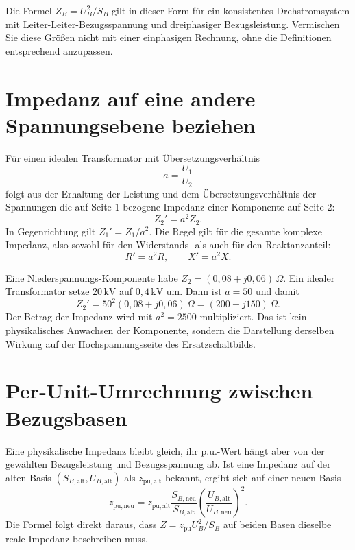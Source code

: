 \begin{merke}
Die Formel $Z_B=U_B^2/S_B$ gilt in dieser Form für ein konsistentes
Drehstromsystem mit Leiter-Leiter-Bezugsspannung und dreiphasiger
Bezugsleistung. Vermischen Sie diese Größen nicht mit einer einphasigen
Rechnung, ohne die Definitionen entsprechend anzupassen.
\end{merke}

\section{Impedanz auf eine andere Spannungsebene beziehen}

Für einen idealen Transformator mit Übersetzungsverhältnis
\begin{equation}
  a=\frac{U_1}{U_2}
\end{equation}
folgt aus der Erhaltung der Leistung und dem Übersetzungsverhältnis der
Spannungen die auf Seite 1 bezogene Impedanz einer Komponente auf Seite 2:
\begin{equation}
  Z_2'=a^2 Z_2.
  \label{eq:impedanz_beziehen}
\end{equation}
In Gegenrichtung gilt $Z_1'=Z_1/a^2$. Die Regel gilt für die gesamte komplexe
Impedanz, also sowohl für den Widerstands- als auch für den Reaktanzanteil:
\begin{equation}
  R'=a^2R,\qquad X'=a^2X.
\end{equation}

\begin{rechenbeispiel}
Eine Niederspannungs-Komponente habe $Z_2=(0{,}08+j0{,}06)\,\Omega$. Ein
idealer Transformator setze $20\,\mathrm{kV}$ auf $0{,}4\,\mathrm{kV}$ um.
Dann ist $a=50$ und damit
\[
 Z_2'=50^2(0{,}08+j0{,}06)\,\Omega
     =(200+j150)\,\Omega.
\]
Der Betrag der Impedanz wird mit $a^2=2500$ multipliziert. Das ist kein
physikalisches Anwachsen der Komponente, sondern die Darstellung derselben
Wirkung auf der Hochspannungsseite des Ersatzschaltbilds.
\end{rechenbeispiel}

\section{Per-Unit-Umrechnung zwischen Bezugsbasen}

Eine physikalische Impedanz bleibt gleich, ihr p.u.-Wert hängt aber von der
gewählten Bezugsleistung und Bezugsspannung ab. Ist eine Impedanz auf der
alten Basis $(S_{B,\mathrm{alt}},U_{B,\mathrm{alt}})$ als
$z_{\mathrm{pu,alt}}$ bekannt, ergibt sich auf einer neuen Basis
\begin{equation}
 z_{\mathrm{pu,neu}}=z_{\mathrm{pu,alt}}
 \frac{S_{B,\mathrm{neu}}}{S_{B,\mathrm{alt}}}
 \left(\frac{U_{B,\mathrm{alt}}}{U_{B,\mathrm{neu}}}\right)^2.
 \label{eq:pu_basiswechsel}
\end{equation}
Die Formel folgt direkt daraus, dass $Z=z_{\mathrm{pu}}U_B^2/S_B$ auf beiden
Basen dieselbe reale Impedanz beschreiben muss.

